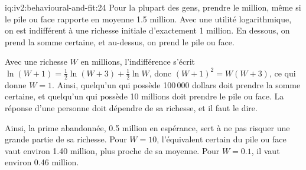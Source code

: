 \begin{solution}{iq:iv2:behavioural-and-fit:24}
Pour la plupart des gens, prendre le million, même si le pile ou face rapporte en moyenne 1.5 million. Avec une utilité logarithmique, on est indifférent à une richesse initiale d'exactement 1 million. En dessous, on prend la somme certaine, et au-dessus, on prend le pile ou face.

Avec une richesse $W$ en millions, l'indifférence s'écrit $\ln(W + 1) = \tfrac12\ln(W + 3) + \tfrac12\ln W$, donc $(W + 1)^2 = W(W + 3)$, ce qui donne $W = 1$. Ainsi, quelqu'un qui possède 100\,000 dollars doit prendre la somme certaine, et quelqu'un qui possède 10 millions doit prendre le pile ou face. La réponse d'une personne doit dépendre de sa richesse, et il faut le dire.

Ainsi, la prime abandonnée, 0.5 million en espérance, sert à ne pas risquer une grande partie de sa richesse. Pour $W = 10$, l'équivalent certain du pile ou face vaut environ 1.40 million, plus proche de sa moyenne. Pour $W = 0.1$, il vaut environ 0.46 million.

\end{solution}

